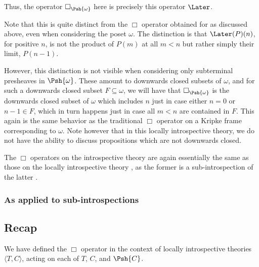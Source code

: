 Thus, the operator $\Box_{\Psh{\omega}}$ here is precisely this operator $\Later$.

Note that this is quite distinct from the $\Box$ operator obtained for  as discussed above, even when considering the poset $\omega$. The distinction is that $\Later(P)(n)$, for positive $n$, is not the product of $P(m)$ at all $m < n$ but rather simply their limit, $P(n - 1)$.

However, this distinction is not visible when considering only subterminal presheaves in $\Psh{\omega}$. These amount to downwards closed subsets of $\omega$, and for such a downwards closed subset $F \subseteq \omega$, we will have that $\Box_{\Psh{\omega}}$ is the downwards closed subset of $\omega$ which includes $n$ just in case either $n = 0$ or $n - 1 \in F$, which in turn happens just in case all $m < n$ are contained in $F$. This again is the same behavior as the traditional $\Box$ operator on a Kripke frame corresponding to $\omega$. Note however that in this locally introspective theory, we do not have the ability to discuss propositions which are not downwards closed.

The $\Box$ operators on the introspective theory  are again essentially the same as those on the locally introspective theory , as the former is a sub-introspection of the latter .

\subsubsection{As applied to sub-introspections}

\subsection{Recap}
We have defined the $\Box$ operator in the context of locally introspective theories $\langle T, C \rangle$, acting on each of $T$, $C$, and $\Psh{C}$.

